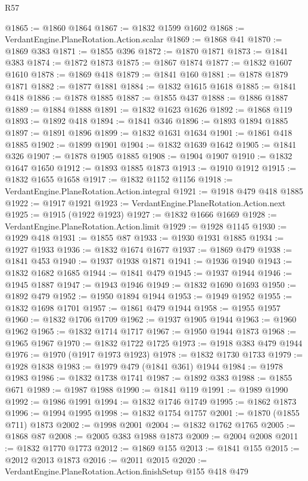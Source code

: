 \begin{lexlean}{R57}
\begin{coremodule}
@1865 := @1860 @1864
@1867 := @1832 @1599 @1602
@1868 := VerdantEngine.PlaneRotation.Action.scalar
@1869 := @1868 @41
@1870 := @1869 @383
@1871 := @1855 @396
@1872 := @1870 @1871
@1873 := @1841 @383
@1874 := @1872 @1873
@1875 := @1867 @1874
@1877 := @1832 @1607 @1610
@1878 := @1869 @418
@1879 := @1841 @160
@1881 := @1878 @1879 @1871
@1882 := @1877 @1881
@1884 := @1832 @1615 @1618
@1885 := @1841 @418
@1886 := @1878 @1885
@1887 := @1855 @437
@1888 := @1886 @1887
@1889 := @1884 @1888
@1891 := @1832 @1623 @1626
@1892 := @1868 @119
@1893 := @1892 @418
@1894 := @1841 @346
@1896 := @1893 @1894 @1885
@1897 := @1891 @1896
@1899 := @1832 @1631 @1634
@1901 := @1861 @418 @1885
@1902 := @1899 @1901
@1904 := @1832 @1639 @1642
@1905 := @1841 @326
@1907 := @1878 @1905 @1885
@1908 := @1904 @1907
@1910 := @1832 @1647 @1650
@1912 := @1893 @1885 @1873
@1913 := @1910 @1912
@1915 := @1832 @1655 @1658
@1917 := @1832 @1152 @1156
@1918 := VerdantEngine.PlaneRotation.Action.integral
@1921 := @1918 @479 @418 @1885
@1922 := @1917 @1921
@1923 := VerdantEngine.PlaneRotation.Action.next
@1925 := @1915 (@1922 @1923)
@1927 := @1832 @1666 @1669
@1928 := VerdantEngine.PlaneRotation.Action.limit
@1929 := @1928 @1145
@1930 := @1929 @418
@1931 := @1855 @87
@1933 := @1930 @1931 @1885
@1934 := @1927 @1933
@1936 := @1832 @1674 @1677
@1937 := @1869 @479
@1938 := @1841 @453
@1940 := @1937 @1938 @1871
@1941 := @1936 @1940
@1943 := @1832 @1682 @1685
@1944 := @1841 @479
@1945 := @1937 @1944
@1946 := @1945 @1887
@1947 := @1943 @1946
@1949 := @1832 @1690 @1693
@1950 := @1892 @479
@1952 := @1950 @1894 @1944
@1953 := @1949 @1952
@1955 := @1832 @1698 @1701
@1957 := @1861 @479 @1944
@1958 := @1955 @1957
@1960 := @1832 @1706 @1709
@1962 := @1937 @1905 @1944
@1963 := @1960 @1962
@1965 := @1832 @1714 @1717
@1967 := @1950 @1944 @1873
@1968 := @1965 @1967
@1970 := @1832 @1722 @1725
@1973 := @1918 @383 @479 @1944
@1976 := @1970 (@1917 @1973 @1923)
@1978 := @1832 @1730 @1733
@1979 := @1928 @1838
@1983 := @1979 @479 (@1841 @361) @1944
@1984 := @1978 @1983
@1986 := @1832 @1738 @1741
@1987 := @1892 @383
@1988 := @1855 @671
@1989 := @1987 @1988
@1990 := @1841 @119
@1991 := @1989 @1990
@1992 := @1986 @1991
@1994 := @1832 @1746 @1749
@1995 := @1862 @1873
@1996 := @1994 @1995
@1998 := @1832 @1754 @1757
@2001 := @1870 (@1855 @711) @1873
@2002 := @1998 @2001
@2004 := @1832 @1762 @1765
@2005 := @1868 @87
@2008 := @2005 @383 @1988 @1873
@2009 := @2004 @2008
@2011 := @1832 @1770 @1773
@2012 := @1869 @155
@2013 := @1841 @155
@2015 := @2012 @2013 @1873
@2016 := @2011 @2015
@2020 := VerdantEngine.PlaneRotation.Action.finishSetup @155 @418 @479

\end{coremodule}
\end{lexlean}

